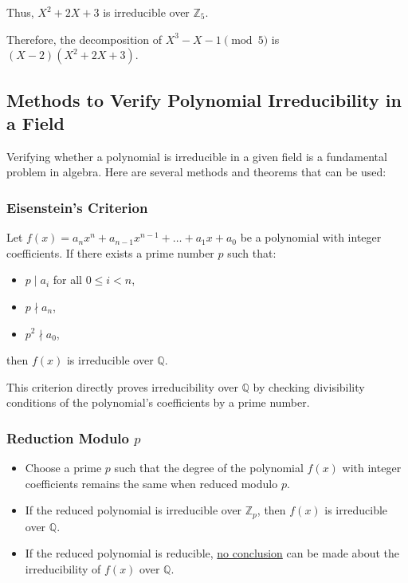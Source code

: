 Thus, $X^2 + 2X + 3$ is irreducible over $\mathbb{Z}_5$.

Therefore, the decomposition of $X^3 - X - 1 \pmod{5}$ is $(X - 2)(X^2 + 2X + 3)$.

\subsection{Methods to Verify Polynomial Irreducibility in a Field}

Verifying whether a polynomial is irreducible in a given field is a fundamental problem in algebra. Here are several methods and theorems that can be used:

\subsubsection{Eisenstein's Criterion}

\begin{theorem}
Let $f(x) = a_n x^n + a_{n-1} x^{n-1} + \dots + a_1 x + a_0$ be a polynomial with integer coefficients. If there exists a prime number $p$ such that:
	\begin{itemize}
		\item $p \mid a_i$ for all $0 \leq i < n$,
		\item $p \nmid  a_n$,
		\item $p^2 \nmid  a_0$,
	\end{itemize}
then $f(x)$ is irreducible over $\mathbb{Q}$.
\end{theorem}
This criterion directly proves irreducibility over $\mathbb{Q}$ by checking divisibility conditions of the polynomial's coefficients by a prime number.

\subsubsection{Reduction Modulo \texorpdfstring{$p$}{p}}

\begin{itemize}
	\item Choose a prime $p$ such that the degree of the polynomial $f(x)$ with integer coefficients remains the same when reduced modulo $p$.
	\item If the reduced polynomial is irreducible over $\mathbb{Z}_p$, then $f(x)$ is irreducible over $\mathbb{Q}$.
	\item If the reduced polynomial is reducible, \underline{no conclusion} can be made about the irreducibility of $f(x)$ over $\mathbb{Q}$.
\end{itemize}

